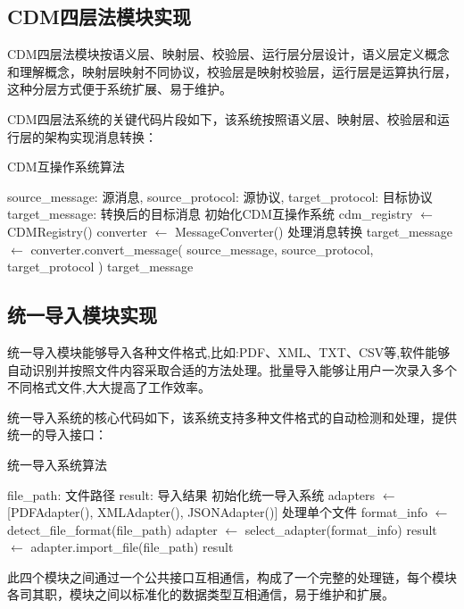 \subsection{CDM四层法模块实现}

CDM四层法模块按语义层、映射层、校验层、运行层分层设计，语义层定义概念和理解概念，映射层映射不同协议，校验层是映射校验层，运行层是运算执行层，这种分层方式便于系统扩展、易于维护。

CDM四层法系统的关键代码片段如下，该系统按照语义层、映射层、校验层和运行层的架构实现消息转换：

\begin{algorithm}[H]
\caption{CDM互操作系统算法}
\begin{algorithmic}[1]
\REQUIRE source\_message: 源消息, source\_protocol: 源协议, target\_protocol: 目标协议
\ENSURE target\_message: 转换后的目标消息
\STATE 初始化CDM互操作系统
\STATE cdm\_registry $\leftarrow$ CDMRegistry()
\STATE converter $\leftarrow$ MessageConverter()
\STATE 处理消息转换
\STATE target\_message $\leftarrow$ converter.convert\_message(
\STATE     source\_message, source\_protocol, target\_protocol
\STATE )
\RETURN target\_message
\end{algorithmic}
\end{algorithm}

\subsection{统一导入模块实现}

统一导入模块能够导入各种文件格式,比如:PDF、XML、TXT、CSV等,软件能够自动识别并按照文件内容采取合适的方法处理。批量导入能够让用户一次录入多个不同格式文件,大大提高了工作效率。

统一导入系统的核心代码如下，该系统支持多种文件格式的自动检测和处理，提供统一的导入接口：

\begin{algorithm}[H]
\caption{统一导入系统算法}
\begin{algorithmic}[1]
\REQUIRE file\_path: 文件路径
\ENSURE result: 导入结果
\STATE 初始化统一导入系统
\STATE adapters $\leftarrow$ [PDFAdapter(), XMLAdapter(), JSONAdapter()]
\STATE 处理单个文件
\STATE format\_info $\leftarrow$ detect\_file\_format(file\_path)
\STATE adapter $\leftarrow$ select\_adapter(format\_info)
\STATE result $\leftarrow$ adapter.import\_file(file\_path)
\RETURN result
\end{algorithmic}
\end{algorithm}

此四个模块之间通过一个公共接口互相通信，构成了一个完整的处理链，每个模块各司其职，模块之间以标准化的数据类型互相通信，易于维护和扩展。




